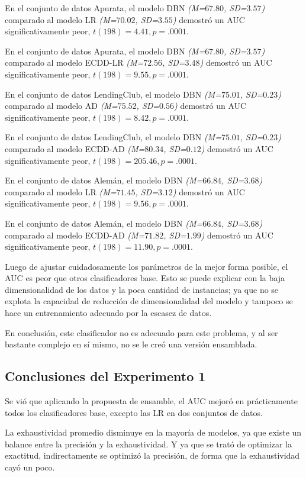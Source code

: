 En el conjunto de datos Apurata, el modelo DBN \textit{(M=$67.80$, SD=$3.57$)} comparado al modelo \ac{LR} \textit{(M=$70.02$, SD=$3.55$)} demostró un \ac{AUC} significativamente peor, $t(198)=4.41, p=.0001$.

En el conjunto de datos Apurata, el modelo DBN \textit{(M=$67.80$, SD=$3.57$)} comparado al modelo ECDD-LR \textit{(M=$72.56$, SD=$3.48$)} demostró un \ac{AUC} significativamente peor, $t(198)=9.55, p=.0001$.

En el conjunto de datos LendingClub, el modelo DBN \textit{(M=$75.01$, SD=$0.23$)} comparado al modelo \ac{AD} \textit{(M=$75.52$, SD=$0.56$)} demostró un \ac{AUC} significativamente peor, $t(198)=8.42, p=.0001$.

En el conjunto de datos LendingClub, el modelo DBN \textit{(M=$75.01$, SD=$0.23$)} comparado al modelo ECDD-AD \textit{(M=$80.34$, SD=$0.12$)} demostró un \ac{AUC} significativamente peor, $t(198)=205.46, p=.0001$.

En el conjunto de datos Alemán, el modelo DBN \textit{(M=$66.84$, SD=$3.68$)} comparado al modelo \ac{LR} \textit{(M=$71.45$, SD=$3.12$)} demostró un \ac{AUC} significativamente peor, $t(198)=9.56, p=.0001$.

En el conjunto de datos Alemán, el modelo DBN \textit{(M=$66.84$, SD=$3.68$)} comparado al modelo ECDD-AD \textit{(M=$71.82$, SD=$1.99$)} demostró un \ac{AUC} significativamente peor, $t(198)=11.90, p=.0001$.

Luego de ajustar cuidadosamente los parámetros de la mejor forma posible, el \ac{AUC} es peor que otros clasificadores base. Esto se puede explicar con la baja dimensionalidad de los datos y la poca cantidad de instancias; ya que no se explota la capacidad de reducción de dimensionalidad del modelo y tampoco se hace un entrenamiento adecuado por la escasez de datos.

En conclusión, este clasificador no es adecuado para este problema, y al ser bastante complejo en sí mismo, no se le creó una versión ensamblada.


\subsection{Conclusiones del Experimento 1}

Se vió que aplicando la propuesta de ensamble, el \ac{AUC} mejoró en prácticamente todos los clasificadores base, excepto las \ac{LR} en dos conjuntos de datos.

La exhaustividad promedio disminuye en la mayoría de modelos, ya que existe un balance entre la precisión y la exhaustividad. Y ya que se trató de optimizar la exactitud, indirectamente se optimizó la precisión, de forma que la exhaustividad cayó un poco.


